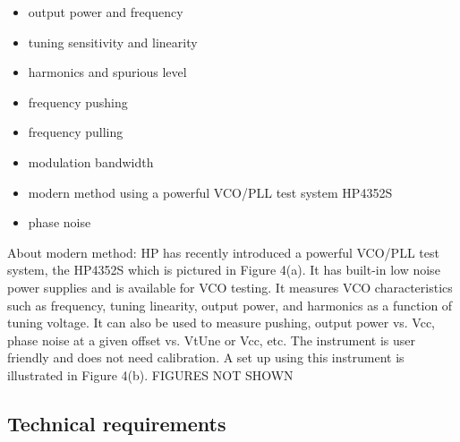 \begin{itemize}
	\item output power and frequency
	\item tuning sensitivity and linearity
	\item harmonics and spurious level
	\item frequency pushing
	\item frequency pulling
	\item modulation bandwidth
	\item modern method using a powerful VCO/PLL test system HP4352S
	\item phase noise
\end{itemize}

About modern method: HP has recently introduced a powerful VCO/PLL test system, the HP4352S which is pictured in Figure 4(a). It has built-in low noise power supplies and is available for VCO testing. It measures VCO characteristics such as frequency, tuning linearity, output power, and harmonics as a function of tuning voltage. It can also be used to measure pushing, output power vs. Vcc, phase noise at a given offset vs. VtUne or Vcc, etc. The instrument is user friendly and does not need calibration. A set up using this instrument is illustrated in Figure 4(b). FIGURES NOT SHOWN\\


\newpage

\subsection{Technical requirements}

